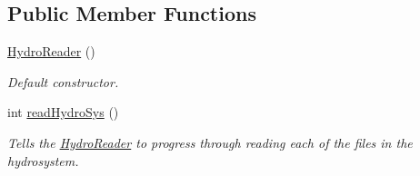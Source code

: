 \subsection*{Public Member Functions}
\begin{DoxyCompactItemize}
\item 
\hyperlink{classosea_1_1_hydro_reader_ad7332fa73196b5914fd2e160ef5d851a}{Hydro\-Reader} ()
\begin{DoxyCompactList}\small\item\em Default constructor. \end{DoxyCompactList}\item 
int \hyperlink{classosea_1_1_hydro_reader_a14cf9364f06b10c03edb1032a6e02827}{read\-Hydro\-Sys} ()
\begin{DoxyCompactList}\small\item\em Tells the \hyperlink{classosea_1_1_hydro_reader}{Hydro\-Reader} to progress through reading each of the files in the hydrosystem. \end{DoxyCompactList}\end{DoxyCompactItemize}
